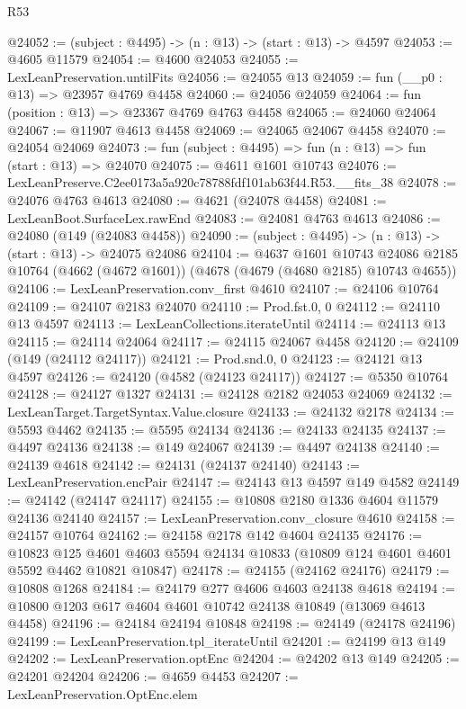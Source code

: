 \begin{lexlean}{R53}
\begin{coremodule}
@24052 := (subject : @4495) -> (n : @13) -> (start : @13) -> @4597
@24053 := @4605 @11579
@24054 := @4600 @24053
@24055 := LexLeanPreservation.untilFits
@24056 := @24055 @13
@24059 := fun (__p0 : @13) => @23957 @4769 @4458
@24060 := @24056 @24059
@24064 := fun (position : @13) => @23367 @4769 @4763 @4458
@24065 := @24060 @24064
@24067 := @11907 @4613 @4458
@24069 := @24065 @24067 @4458
@24070 := @24054 @24069
@24073 := fun (subject : @4495) => fun (n : @13) => fun (start : @13) => @24070
@24075 := @4611 @1601 @10743
@24076 := LexLeanPreserve.C2ee0173a5a920c78788fdf101ab63f44.R53.__fits_38
@24078 := @24076 @4763 @4613
@24080 := @4621 (@24078 @4458)
@24081 := LexLeanBoot.SurfaceLex.rawEnd
@24083 := @24081 @4763 @4613
@24086 := @24080 (@149 (@24083 @4458))
@24090 := (subject : @4495) -> (n : @13) -> (start : @13) -> @24075 @24086
@24104 := @4637
    @1601
    @10743
    @24086
    @2185
    @10764
    (@4662 (@4672 @1601))
    (@4678 (@4679 (@4680 @2185) @10743 @4655))
@24106 := LexLeanPreservation.conv_first @4610
@24107 := @24106 @10764
@24109 := @24107 @2183 @24070
@24110 := Prod.fst.{0, 0}
@24112 := @24110 @13 @4597
@24113 := LexLeanCollections.iterateUntil
@24114 := @24113 @13
@24115 := @24114 @24064
@24117 := @24115 @24067 @4458
@24120 := @24109 (@149 (@24112 @24117))
@24121 := Prod.snd.{0, 0}
@24123 := @24121 @13 @4597
@24126 := @24120 (@4582 (@24123 @24117))
@24127 := @5350 @10764
@24128 := @24127 @1327
@24131 := @24128 @2182 @24053 @24069
@24132 := LexLeanTarget.TargetSyntax.Value.closure
@24133 := @24132 @2178
@24134 := @5593 @4462
@24135 := @5595 @24134
@24136 := @24133 @24135
@24137 := @4497 @24136
@24138 := @149 @24067
@24139 := @4497 @24138
@24140 := @24139 @4618
@24142 := @24131 (@24137 @24140)
@24143 := LexLeanPreservation.encPair
@24147 := @24143 @13 @4597 @149 @4582
@24149 := @24142 (@24147 @24117)
@24155 := @10808 @2180 @1336 @4604 @11579 @24136 @24140
@24157 := LexLeanPreservation.conv_closure @4610
@24158 := @24157 @10764
@24162 := @24158 @2178 @142 @4604 @24135
@24176 := @10823
    @125
    @4601
    @4603
    @5594
    @24134
    @10833
    (@10809 @124 @4601 @4601 @5592 @4462 @10821 @10847)
@24178 := @24155 (@24162 @24176)
@24179 := @10808 @1268
@24184 := @24179 @277 @4606 @4603 @24138 @4618
@24194 := @10800 @1203 @617 @4604 @4601 @10742 @24138 @10849 (@13069 @4613 @4458)
@24196 := @24184 @24194 @10848
@24198 := @24149 (@24178 @24196)
@24199 := LexLeanPreservation.tpl_iterateUntil
@24201 := @24199 @13 @149
@24202 := LexLeanPreservation.optEnc
@24204 := @24202 @13 @149
@24205 := @24201 @24204
@24206 := @4659 @4453
@24207 := LexLeanPreservation.OptEnc.elem

\end{coremodule}
\end{lexlean}
